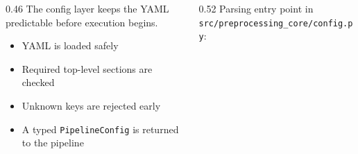 \begin{frame}

  \vspace{14mm}
  \begin{columns}[T,onlytextwidth]
    \begin{column}{0.46\textwidth}
      {\small The config layer keeps the YAML predictable before execution begins.}\par
      \vspace{1.5mm}
      \begin{itemize}
        \item YAML is loaded safely
        \item Required top-level sections are checked
        \item Unknown keys are rejected early
        \item A typed \texttt{PipelineConfig} is returned to the pipeline
      \end{itemize}
    \end{column}
    \begin{column}{0.52\textwidth}
      {\scriptsize Parsing entry point in \verb|src/preprocessing_core/config.py|:}\par
      \vspace{1mm}
      
    \end{column}
  \end{columns}

  \slideheaderfooter
\end{frame}
